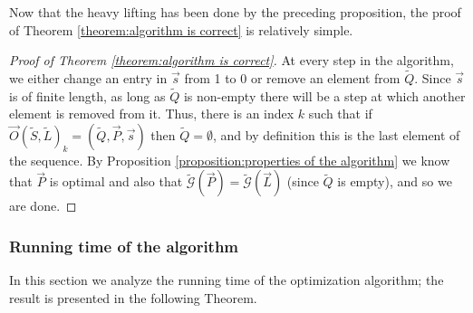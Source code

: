 \documentclass[twocolumn,showpacs,preprintnumbers,amsmath,amssymb,nofootinbib,pra,floatfix]{revtex4-1}
\newenvironment{remark}[1][Remark]{\begin{trivlist}
\item[\hskip \labelsep {\bfseries #1}]}{\end{trivlist}}
\newcommand{\lst}{\vec}
\newcommand{\set}{\tilde}
\newcommand{\genfun}{\tilde{\mathcal{G}}}
\begin{document}
\begin{remark}
Now that the heavy lifting has been done by the preceding proposition, the proof of Theorem \ref{theorem:algorithm is correct} is relatively simple.
\end{remark}

\begin{proof}[Proof of Theorem \ref{theorem:algorithm is correct}]
At every step in the algorithm, we either change an entry in $\lst s$ from 1 to 0 or remove an element from $\set Q$.  Since $\lst s$ is of finite length, as long as $\set Q$ is non-empty there will be a step at which another element is removed from it.  Thus, there is an index $k$ such that if $\lst O(\set S,\set L)_k=(\set Q,\lst P,\lst s)$ then $\set Q=\emptyset$, and by definition this is the last element of the sequence.  By Proposition \ref{proposition:properties of the algorithm} we know that $\lst P$ is optimal and also that $\genfun(\lst P)=\genfun(\lst L)$ (since $\set Q$ is empty), and so we are done.
\end{proof}
\subsubsection{Running time of the algorithm}

\label{subsubsection:running time analysis}

In this section we analyze the running time of the optimization algorithm;  the result is presented in the following Theorem.
\end{document}
